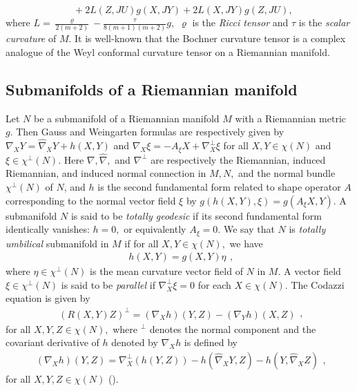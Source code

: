 \documentclass{amsart}
\newtheorem*{theorem A}{Theorem A}
\newtheorem*{theorem B}{N\"olker's Theorem}
\theoremstyle{remark}
\theoremstyle{remark}
\theoremstyle{definition}
\numberwithin{equation}{section}
\begin{document}
$\quad\quad\quad\quad\quad\quad\quad+2L(Z,JU)g(X,JY)+2L(X,JY)g(Z,JU),$\\

where $L=\frac{\varrho}{2(m+2)} -\frac{\tau}{8(m+1)(m+2)}g,$
$\varrho$ is the \emph{Ricci tensor} and $\tau$ is the \emph{scalar
curvature} of $M.$ It is well-known that the Bochner curvature
tensor is a complex analogue of the Weyl conformal curvature tensor
\cite{Yan} on a Riemannian manifold.
\subsection{Submanifolds of a Riemannian manifold}
Let $N$ be a submanifold of a Riemannian manifold $M$ with a
Riemannian metric $g.$ Then Gauss and Weingarten formulas are
respectively given by $\nabla_{X}Y=\hat{\nabla}_{X}Y+h(X,Y)$  and
$\nabla_{X}\xi=-A_{\xi}X+\nabla_{X}^{\bot}\xi$ for all
$X,Y\in\chi(N)$ and $\xi\in\chi^{\bot}(N)$. Here $\nabla,
\hat{\nabla},$ and $\nabla^{\bot}$ are respectively the Riemannian,
induced Riemannian, and induced normal connection in $M, N,$ and the
normal bundle $\chi^{\bot}(N)$ of $N$, and $h$ is the second
fundamental form related to shape operator $A$ corresponding to the
normal vector field $\xi$ by $g(h(X,Y),\xi)=g(A_{\xi}X,Y).$ A
submanifold $N$ is said to be \emph{totally geodesic} if its second
fundamental form identically vanishes: $h=0,$ or equivalently
$A_{\xi}=0.$ We say that $N$ is \emph{totally umbilical} submanifold
in $M$ if for all $X,Y\in\chi(N),$ we have
\begin{equation}
\label{e1}
\begin{array}{c}
h(X,Y)=g(X,Y)\eta
\end{array},
\end{equation}
where $\eta\in\chi^{\bot}(N)$ is the mean curvature vector field of
$N$ in $M$. A vector field $\xi\in\chi^{\bot}(N)$ is said to be
\emph{parallel} if $ \nabla^{\bot}_{X}\xi=0$ for each $X\in\chi(N)$.
The Codazzi equation is given by
\begin{equation}
\label{e1}
\begin{array}{c}
(R(X,Y)Z)^{\bot}=(\nabla_{X}h)(Y,Z)-(\nabla_{Y}h)(X,Z)
\end{array},
\end{equation}
for all $X,Y,Z\in\chi(N),$ where $^{\bot}$ denotes the normal
component and the covariant derivative of $h$ denoted by
$\nabla_{X}h$ is defined by
\begin{equation}
\label{e1}
\begin{array}{c}
(\nabla_{X}h)(Y,Z)=\nabla^{\bot}_{X}(h(Y,Z))-h(\hat{\nabla}_{X}Y,Z)-h(Y,\hat{\nabla}_{X}Z)
\end{array},
\end{equation}
for all $X,Y,Z\in\chi(N)$ (\cite{BChe,Gol,Ha,Yama}).
\end{document}
